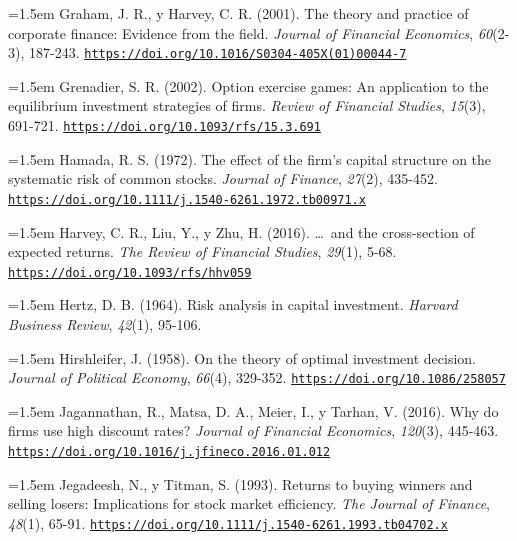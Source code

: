 \documentclass[10pt,a4paper]{article}
\begin{document}
\noindent\hangindent=1.5em Graham, J. R., y Harvey, C. R. (2001). The theory and practice of corporate finance: Evidence from the field. \textit{Journal of Financial Economics}, \textit{60}(2-3), 187-243. \href{https://doi.org/10.1016/S0304-405X(01)00044-7}{\nolinkurl{https://doi.org/10.1016/S0304-405X(01)00044-7}}

\noindent\hangindent=1.5em Grenadier, S. R. (2002). Option exercise games: An application to the equilibrium investment strategies of firms. \textit{Review of Financial Studies}, \textit{15}(3), 691-721. \href{https://doi.org/10.1093/rfs/15.3.691}{\nolinkurl{https://doi.org/10.1093/rfs/15.3.691}}

\noindent\hangindent=1.5em Hamada, R. S. (1972). The effect of the firm's capital structure on the systematic risk of common stocks. \textit{Journal of Finance}, \textit{27}(2), 435-452. \href{https://doi.org/10.1111/j.1540-6261.1972.tb00971.x}{\nolinkurl{https://doi.org/10.1111/j.1540-6261.1972.tb00971.x}}

\noindent\hangindent=1.5em Harvey, C. R., Liu, Y., y Zhu, H. (2016). \ldots\ and the cross-section of expected returns. \textit{The Review of Financial Studies}, \textit{29}(1), 5-68. \href{https://doi.org/10.1093/rfs/hhv059}{\nolinkurl{https://doi.org/10.1093/rfs/hhv059}}

\noindent\hangindent=1.5em Hertz, D. B. (1964). Risk analysis in capital investment. \textit{Harvard Business Review}, \textit{42}(1), 95-106.

\noindent\hangindent=1.5em Hirshleifer, J. (1958). On the theory of optimal investment decision. \textit{Journal of Political Economy}, \textit{66}(4), 329-352. \href{https://doi.org/10.1086/258057}{\nolinkurl{https://doi.org/10.1086/258057}}

\noindent\hangindent=1.5em Jagannathan, R., Matsa, D. A., Meier, I., y Tarhan, V. (2016). Why do firms use high discount rates? \textit{Journal of Financial Economics}, \textit{120}(3), 445-463. \href{https://doi.org/10.1016/j.jfineco.2016.01.012}{\nolinkurl{https://doi.org/10.1016/j.jfineco.2016.01.012}}

\noindent\hangindent=1.5em Jegadeesh, N., y Titman, S. (1993). Returns to buying winners and selling losers: Implications for stock market efficiency. \textit{The Journal of Finance}, \textit{48}(1), 65-91. \href{https://doi.org/10.1111/j.1540-6261.1993.tb04702.x}{\nolinkurl{https://doi.org/10.1111/j.1540-6261.1993.tb04702.x}}
\end{document}
